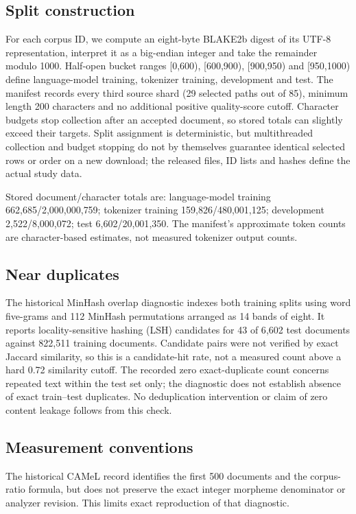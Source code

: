\documentclass{ieeeaccess}
\begin{document}
\subsection*{Split construction}
For each corpus ID, we compute an eight-byte BLAKE2b digest of its UTF-8 representation, interpret it as a big-endian integer and take the remainder modulo 1000. Half-open bucket ranges [0,600), [600,900), [900,950) and [950,1000) define language-model training, tokenizer training, development and test. The manifest records every third source shard (29 selected paths out of 85), minimum length 200 characters and no additional positive quality-score cutoff. Character budgets stop collection after an accepted document, so stored totals can slightly exceed their targets. Split assignment is deterministic, but multithreaded collection and budget stopping do not by themselves guarantee identical selected rows or order on a new download; the released files, ID lists and hashes define the actual study data.

Stored document/character totals are: language-model training 662{,}685/2{,}000{,}000{,}759; tokenizer training 159{,}826/480{,}001{,}125; development 2{,}522/8{,}000{,}072; test 6{,}602/20{,}001{,}350. The manifest's approximate token counts are character-based estimates, not measured tokenizer output counts.

\subsection*{Near duplicates}
The historical MinHash overlap diagnostic \cite{broder1997resemblance} indexes both training splits using word five-grams and 112 MinHash permutations arranged as 14 bands of eight. It reports locality-sensitive hashing (LSH) candidates for 43 of 6{,}602 test documents against 822{,}511 training documents. Candidate pairs were not verified by exact Jaccard similarity, so this is a candidate-hit rate, not a measured count above a hard 0.72 similarity cutoff. The recorded zero exact-duplicate count concerns repeated text within the test set only; the diagnostic does not establish absence of exact train--test duplicates. No deduplication intervention or claim of zero content leakage follows from this check.

\subsection*{Measurement conventions}
The historical CAMeL record identifies the first 500 documents and the
corpus-ratio formula, but does not preserve the exact integer morpheme
denominator or analyzer revision. This limits exact reproduction of that
diagnostic.
\end{document}
